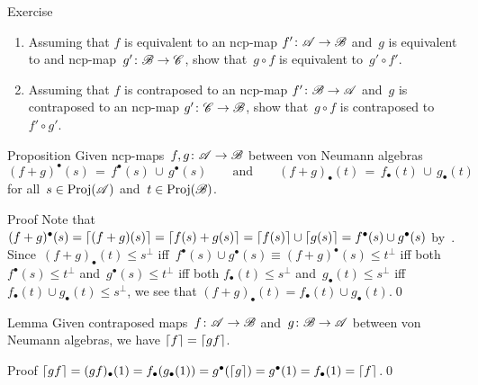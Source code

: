 \documentclass[a]{subfiles}
\begin{document}
\begin{parsec}
\begin{point}{Exercise}
\begin{enumerate}
\item
Assuming that $f$ is equivalent 
to an ncp-map $f'\colon \mathscr{A}\to\mathscr{B}$
and~$g$ is equivalent to
and ncp-map~$g'\colon \mathscr{B}\to\mathscr{C}$,
show that~$g\circ f$ is equivalent to~$g'\circ f'$.
\item
Assuming that $f$ is contraposed to
an ncp-map $f'\colon \mathscr{B}\to\mathscr{A}$
and~$g$ is contraposed to
an ncp-map $g'\colon \mathscr{C}\to\mathscr{B}$,
show that~$g\circ f$ is contraposed to~$f'\circ g'$.
\end{enumerate}
\end{point}
\begin{point}{Proposition}%
Given ncp-maps~$f,g\colon \mathscr{A}\to\mathscr{B}$
between von Neumann algebras
\begin{equation*}
(f+g)^\bullet(s) \,=\, f^\bullet(s)\, \cup\, g^\bullet(s)
\qquad
\text{and}
\qquad (f+g)_\bullet(t)\, =\, f_\bullet(t) \,\cup\, g_\bullet(t)
\end{equation*}
for all~$s\in \operatorname{Proj}(\mathscr{A})$ and~$t\in \operatorname{Proj}(\mathscr{B})$.
\begin{point}{Proof}%
Note that $(f+g)^\bullet(s)
=  \left\lceil(f+g)(s)\right\rceil
= \left\lceil f(s)+g(s)\right\rceil
= \left\lceil f(s)\right\rceil\cup \left\lceil g(s)\right\rceil
= f^\bullet(s) \cup g^\bullet(s)$
by~.
Since~$(f+g)_\bullet(t)\leq s^\perp$
iff~$f^\bullet(s)\cup g^\bullet(s)\equiv (f+g)^\bullet(s)\leq t^\perp$
iff both $f^\bullet(s)\leq t^\perp$ and~$g^\bullet(s)\leq t^\perp$
iff both $f_\bullet(t)\leq s^\perp$ and~$g_\bullet(t)\leq s^\perp$
iff~$f_\bullet(t)\cup g_\bullet(t)\leq s^\perp$,
we see that $(f+g)_\bullet(t)=f_\bullet(t)\cup g_\bullet(t)$.\qed
\end{point}
\end{point}
\begin{point}{Lemma}%
Given contraposed
maps~$f\colon \mathscr{A}\to\mathscr{B}$
and~$g\colon \mathscr{B}\to\mathscr{A}$ between von Neumann algebras,
we have $\left\lceil f\right\rceil=\left\lceil gf\right\rceil$.
\begin{point}{Proof}%
$\left\lceil gf\right\rceil=(gf)_\bullet(1)
= f_\bullet(g_\bullet(1))
= g^\bullet(\left\lceil g\right\rceil)
= g^\bullet(1)=f_\bullet(1)=\left\lceil f\right\rceil$.\qed
\end{point}
\end{point}
\end{parsec}
\end{document}

